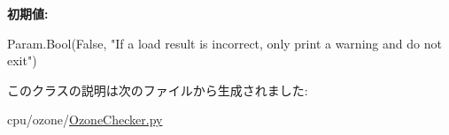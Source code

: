 \label{classOzoneChecker_1_1OzoneChecker_a2c725933b14b9d3c867f1ab31a36274e}
{\bfseries 初期値:}
\begin{DoxyCode}
Param.Bool(False,
        "If a load result is incorrect, only print a warning and do not exit")
\end{DoxyCode}


このクラスの説明は次のファイルから生成されました:\begin{DoxyCompactItemize}
\item 
cpu/ozone/\hyperlink{OzoneChecker_8py}{OzoneChecker.py}\end{DoxyCompactItemize}
